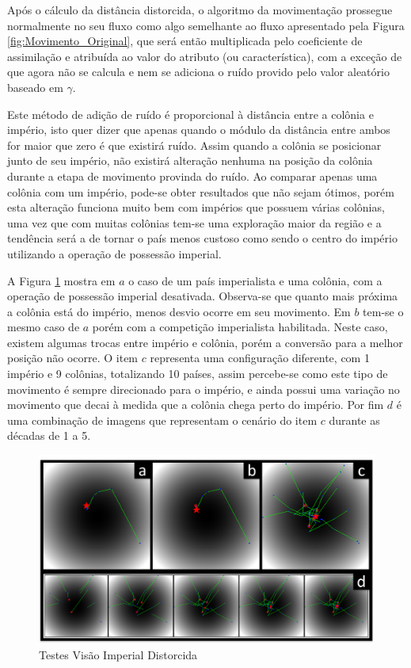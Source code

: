 Após o cálculo da distância distorcida, o algoritmo da movimentação prossegue normalmente no seu fluxo como algo semelhante ao fluxo apresentado pela Figura \ref{fig:Movimento_Original}, que será então multiplicada pelo coeficiente de assimilação e atribuída ao valor do atributo (ou característica), com a exceção de que agora não se calcula e nem se adiciona o ruído provido pelo valor aleatório baseado em \(\gamma\). 

Este método de adição de ruído é proporcional à distância entre a colônia e império, isto quer dizer que apenas quando o módulo da distância entre ambos for maior que zero é que existirá ruído. Assim quando a colônia se posicionar junto de seu império, não existirá alteração nenhuma na posição da colônia durante a etapa de movimento provinda do ruído. Ao comparar apenas uma colônia com um império, pode-se obter resultados que não sejam ótimos, porém esta alteração funciona muito bem com impérios que possuem várias colônias, uma vez que com muitas colônias tem-se uma exploração maior da região e a tendência será a de tornar o país menos custoso como sendo o centro do império utilizando a operação de possessão imperial.


A Figura \ref{fig:Testes_Vis_o_Imperial_Distorcida} mostra em \(a\) o caso de um país imperialista e uma colônia, com a operação de possessão imperial desativada. Observa-se que quanto mais próxima a colônia está do império, menos desvio ocorre em seu movimento. Em \(b\) tem-se o mesmo caso de \(a\) porém com a competição imperialista habilitada. Neste caso, existem algumas trocas entre império e colônia, porém a conversão para a melhor posição não ocorre. O item \(c\) representa uma configuração diferente, com 1 império e 9 colônias, totalizando 10 países, assim percebe-se como este tipo de movimento é sempre direcionado para o império, e ainda possui uma variação no movimento que decai à medida que a colônia chega perto do império. Por fim \(d\) é uma combinação de imagens que representam o cenário do item \(c\) durante as décadas de 1 a 5.

\begin{figure}[h]
	\centering
	\includegraphics[scale=0.6]{Figuras/Testes_Vis_o_Imperial_Distorcida.png}
	\caption{Testes Visão Imperial Distorcida}
	\label{fig:Testes_Vis_o_Imperial_Distorcida}
\end{figure}

